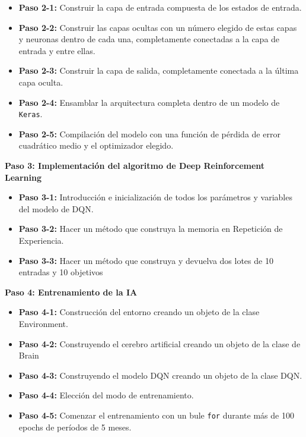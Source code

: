 \documentclass[
]{book}
\providecommand{\tightlist}{%
  \setlength{\itemsep}{0pt}\setlength{\parskip}{0pt}}
\begin{document}
\begin{itemize}
\tightlist
\item
  \textbf{Paso 2-1:} Construir la capa de entrada compuesta de los estados de entrada.
\item
  \textbf{Paso 2-2:} Construir las capas ocultas con un número elegido de estas capas y neuronas dentro de cada una, completamente conectadas a la capa de entrada y entre ellas.
\item
  \textbf{Paso 2-3:} Construir la capa de salida, completamente conectada a la última capa oculta.
\item
  \textbf{Paso 2-4:} Ensamblar la arquitectura completa dentro de un modelo de \texttt{Keras}.
\item
  \textbf{Paso 2-5:} Compilación del modelo con una función de pérdida de error cuadrático medio y el optimizador elegido.
\end{itemize}

\textbf{Paso 3: Implementación del algoritmo de Deep Reinforcement Learning}

\begin{itemize}
\tightlist
\item
  \textbf{Paso 3-1:} Introducción e inicialización de todos los parámetros y variables del modelo de DQN.
\item
  \textbf{Paso 3-2:} Hacer un método que construya la memoria en Repetición de Experiencia.
\item
  \textbf{Paso 3-3:} Hacer un método que construya y devuelva dos lotes de 10 entradas y 10 objetivos
\end{itemize}

\textbf{Paso 4: Entrenamiento de la IA}

\begin{itemize}
\tightlist
\item
  \textbf{Paso 4-1:} Construcción del entorno creando un objeto de la clase Environment.
\item
  \textbf{Paso 4-2:} Construyendo el cerebro artificial creando un objeto de la clase de Brain
\item
  \textbf{Paso 4-3:} Construyendo el modelo DQN creando un objeto de la clase DQN.
\item
  \textbf{Paso 4-4:} Elección del modo de entrenamiento.
\item
  \textbf{Paso 4-5:} Comenzar el entrenamiento con un bule \texttt{for} durante más de 100 epochs de períodos de 5 meses.
\end{itemize}
\end{document}
